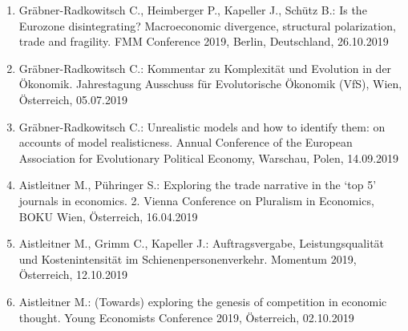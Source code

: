 \begin{enumerate}
	\item Gräbner-Radkowitsch C., Heimberger P., Kapeller J., Schütz B.: Is the Eurozone disintegrating? Macroeconomic divergence, structural polarization, trade and fragility. FMM Conference 2019, Berlin, Deutschland, 26.10.2019
	\item Gräbner-Radkowitsch C.: Kommentar zu Komplexität und Evolution in der Ökonomik. Jahrestagung Ausschuss für Evolutorische Ökonomik (VfS), Wien, Österreich, 05.07.2019
	\item Gräbner-Radkowitsch C.: Unrealistic models and how to identify them: on accounts of model realisticness. Annual Conference of the European Association for Evolutionary Political Economy, Warschau, Polen, 14.09.2019
	\item Aistleitner M., Pühringer S.: Exploring the trade narrative in the ‘top 5’ journals in economics. 2. Vienna Conference on Pluralism in Economics, BOKU Wien, Österreich, 16.04.2019
	\item Aistleitner M., Grimm C., Kapeller J.: Auftragsvergabe, Leistungsqualität und Kostenintensität im Schienenpersonenverkehr. Momentum 2019, Österreich, 12.10.2019
	\item Aistleitner M.: (Towards) exploring the genesis of competition in economic thought. Young Economists Conference 2019, Österreich, 02.10.2019
\end{enumerate}

